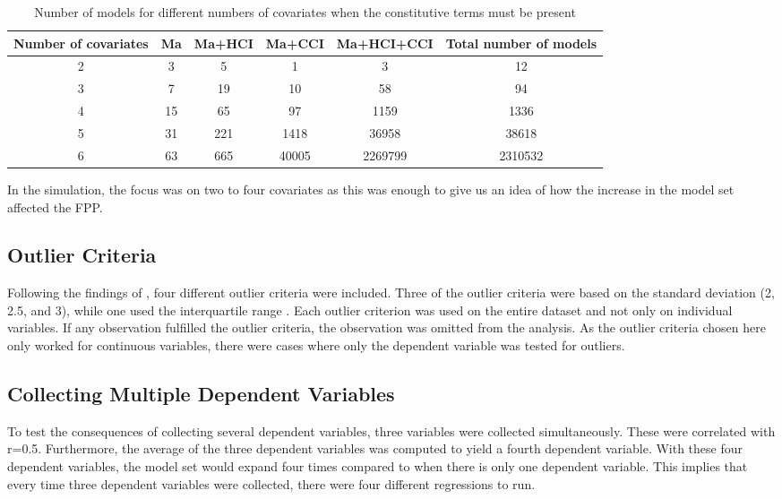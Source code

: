 \begin{table}
\caption{}
\centering
\caption*{\footnotesize Number of models for different numbers of covariates when the constitutive terms must be present}
\begin{tabular}{cccccc} \hline
\toprule
Number of covariates & Ma & Ma+HCI & Ma+CCI & Ma+HCI+CCI & Total number of models \\ 
\midrule
2 & 3 & 5 & 1 & 3 & 12 \\ 
3 & 7 & 19 & 10 & 58 & 94 \\ 
4 & 15 & 65 & 97 & 1159 & 1336 \\ 
5 & 31 & 221 & 1418 & 36958 & 38618 \\ 
6 & 63 & 665 & 40005 & 2269799 & 2310532 \\ 
\bottomrule
\end{tabular}
\end{table}




In the simulation, the focus was on two to four covariates as this was enough to give us an idea of how the increase in the model set affected the FPP. 

\subsection{Outlier Criteria}
Following the findings of \cite{Leyes2013}, four different outlier criteria were included. Three of the outlier criteria were based on the standard deviation (2, 2.5, and 3), while one used the interquartile range \citep{Rousseeuw2011}. Each outlier criterion was used on the entire dataset and not only on individual variables. If any observation fulfilled the outlier criteria, the observation was omitted from the analysis. As the outlier criteria chosen here only worked for continuous variables, there were cases where only the dependent variable was tested for outliers.

\subsection{Collecting Multiple Dependent Variables}
To test the consequences of collecting several dependent variables, three variables were collected simultaneously. These were correlated with r=0.5. Furthermore, the average of the three dependent variables was computed to yield a fourth dependent variable. With these four dependent variables, the model set would expand four times compared to when there is only one dependent variable. This implies that every time three dependent variables were collected, there were four different regressions to run.

